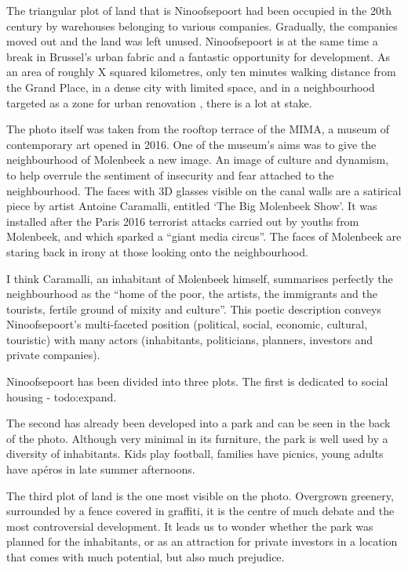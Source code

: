 \documentclass{article}[11pt]
\begin{document}
The triangular plot of land that is Ninoofsepoort had been occupied in the 20th century by warehouses belonging to various companies. Gradually, the companies moved out and the land was left unused.
Ninoofsepoort is at the same time a break in Brussel's urban fabric and a fantastic opportunity for development. As an area of roughly X squared kilometres, only ten minutes walking distance from the Grand Place, in a dense city with limited space, and in a neighbourhood targeted as a zone for urban renovation \parencite{perspective2020zru}, there is a lot at stake.

The photo itself was taken from the rooftop terrace of the MIMA, a museum of contemporary art opened in 2016. One of the museum's aims was to give the neighbourhood of Molenbeek a new image. An image of culture and dynamism, to help overrule the sentiment of insecurity and fear attached to the neighbourhood. The faces with 3D glasses visible on the canal walls are a satirical piece by artist Antoine Caramalli, entitled `The Big Molenbeek Show'. It was installed after the Paris 2016 terrorist attacks carried out by youths from Molenbeek, and which sparked a ``giant media circus''\parencite{antoine2016canal}. The faces of Molenbeek are staring back in irony at those looking onto the neighbourhood.

I think Caramalli, an inhabitant of Molenbeek himself, summarises perfectly the neighbourhood as the ``home of the poor, the artists, the immigrants and the tourists, fertile ground of mixity and culture''\parencite{antoine2016canal}.
This poetic description conveys Ninoofsepoort's multi-faceted position (political, social, economic, cultural, touristic) with many actors (inhabitants, politicians, planners, investors and private companies).


Ninoofsepoort has been divided into three plots. 
The first is dedicated to social housing - todo:expand.

The second has already been developed into a park and can be seen in the back of the photo. Although very minimal in its furniture, the park is well used by a diversity of inhabitants. Kids play football, families have picnics, young adults have apéros in late summer afternoons.

The third plot of land is the one most visible on the photo. Overgrown greenery, surrounded by a fence covered in graffiti, it is the centre of much debate and the most controversial development. It leads us to wonder whether the park was planned for the inhabitants, or as an attraction for private investors in a location that comes with much potential, but also much prejudice.
\end{document}
